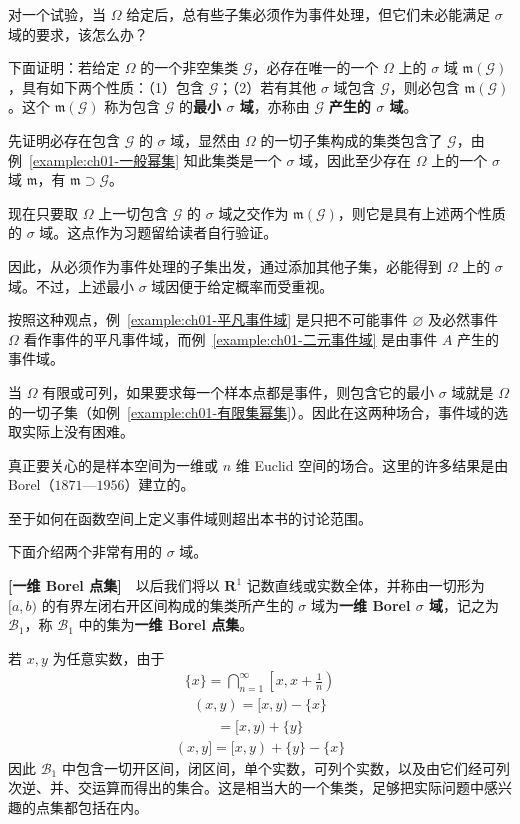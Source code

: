 \documentclass[../../main.tex]{subfiles}
\begin{document}
对一个试验，当 $\Omega$ 给定后，总有些子集必须作为事件处理，但它们未必能满足 $\sigma$ 域的要求，该怎么办？

下面证明：若给定 $\Omega$ 的一个非空集类 $\mathscr{G}$，必存在唯一的一个 $\Omega$ 上的 $\sigma$ 域 $\mathfrak{m}(\mathscr{G})$，具有如下两个性质：（1）包含 $\mathscr{G}$；（2）若有其他 $\sigma$ 域包含 $\mathscr{G}$，则必包含 $\mathfrak{m}(\mathscr{G})$。这个 $\mathfrak{m}(\mathscr{G})$ 称为包含 $\mathscr{G}$ 的\textbf{最小 $\sigma$ 域}，亦称由 $\mathscr{G}$ \textbf{产生的 $\sigma$ 域}。

先证明必存在包含 $\mathscr{G}$ 的 $\sigma$ 域，显然由 $\Omega$ 的一切子集构成的集类包含了 $\mathscr{G}$，由例~\ref{example:ch01-一般幂集} 知此集类是一个 $\sigma$ 域，因此至少存在 $\Omega$ 上的一个 $\sigma$ 域 $\mathfrak{m}$，有 $\mathfrak{m}\supset\mathscr{G}$。

现在只要取 $\Omega$ 上一切包含 $\mathscr{G}$ 的 $\sigma$ 域之交作为 $\mathfrak{m}(\mathscr{G})$，则它是具有上述两个性质的 $\sigma$ 域。这点作为习题留给读者自行验证。

因此，从必须作为事件处理的子集出发，通过添加其他子集，必能得到 $\Omega$ 上的 $\sigma$ 域。不过，上述最小 $\sigma$ 域因便于给定概率而受重视。

按照这种观点，例~\ref{example:ch01-平凡事件域} 是只把不可能事件 $\varnothing$ 及必然事件 $\Omega$ 看作事件的平凡事件域，而例~\ref{example:ch01-二元事件域} 是由事件 $A$ 产生的事件域。

当 $\Omega$ 有限或可列，如果要求每一个样本点都是事件，则包含它的最小 $\sigma$ 域就是 $\Omega$ 的一切子集（如例~\ref{example:ch01-有限集幂集}）。因此在这两种场合，事件域的选取实际上没有困难。

真正要关心的是样本空间为一维或 $n$ 维 Euclid 空间的场合。这里的许多结果是由 Borel（$1871$—$1956$）建立的。

至于如何在函数空间上定义事件域则超出本书的讨论范围。

下面介绍两个非常有用的 $\sigma$ 域。

\textbf{[一维 Borel 点集]}~~以后我们将以 $\mathbf{R}^1$ 记数直线或实数全体，并称由一切形为 $[a,b)$ 的有界左闭右开区间构成的集类所产生的 $\sigma$ 域为\textbf{一维 Borel $\sigma$ 域}，记之为 $\mathscr{B}_1$，称 $\mathscr{B}_1$ 中的集为\textbf{一维 Borel 点集}。

若 $x,y$ 为任意实数，由于
\begin{align*}
\{x\}=\bigcap_{n=1}^{\infty}\left[x,x+\frac{1}{n}\right)
\end{align*}
\begin{align*}
(x,y)=[x,y)-\{x\}
\end{align*}
\begin{align*}
[x,y]=[x,y)+\{y\}
\end{align*}
\begin{align*}
(x,y]=[x,y)+\{y\}-\{x\}
\end{align*}
因此 $\mathscr{B}_1$ 中包含一切开区间，闭区间，单个实数，可列个实数，以及由它们经可列次逆、并、交运算而得出的集合。这是相当大的一个集类，足够把实际问题中感兴趣的点集都包括在内。
\end{document}
